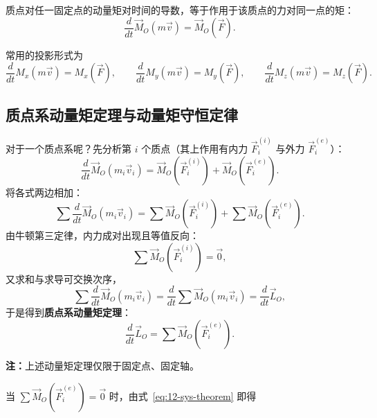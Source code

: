 \begin{theorem}[质点的动量矩定理]
质点对任一固定点的动量矩对时间的导数，等于作用于该质点的力对同一点的矩：
\begin{equation}\label{eq:12-theorem-particle}
  \frac{d}{dt}\vec{M}_O(m\vec{v})=\vec{M}_O\left(\vec{F}\right).
\end{equation}
\end{theorem}

常用的投影形式为
\begin{equation}\label{eq:12-projections}
  \frac{d}{dt}M_x(m\vec{v})=M_x(\vec{F}),\qquad
  \frac{d}{dt}M_y(m\vec{v})=M_y(\vec{F}),\qquad
  \frac{d}{dt}M_z(m\vec{v})=M_z(\vec{F}).
\end{equation}

\subsection{质点系动量矩定理与动量矩守恒定律}

对于一个质点系呢？先分析第 $i$ 个质点（其上作用有内力 $\vec{F}_i^{(i)}$ 与外力 $\vec{F}_i^{(e)}$）：
\begin{equation}\label{eq:12-sys-particle-i}
  \frac{d}{dt}\vec{M}_O(m_i\vec{v}_i)
  =\vec{M}_O\left(\vec{F}_i^{(i)}\right)+\vec{M}_O\left(\vec{F}_i^{(e)}\right).
\end{equation}
将各式两边相加：
\begin{equation}\label{eq:12-sys-sum}
  \sum\frac{d}{dt}\vec{M}_O(m_i\vec{v}_i)
  =\sum\vec{M}_O\left(\vec{F}_i^{(i)}\right)+\sum\vec{M}_O\left(\vec{F}_i^{(e)}\right).
\end{equation}
由牛顿第三定律，内力成对出现且等值反向：
\begin{equation}\label{eq:12-inner-zero}
  \sum\vec{M}_O\left(\vec{F}_i^{(i)}\right)=\vec{0},
\end{equation}
又求和与求导可交换次序，
\begin{equation}\label{eq:12-sum-diff}
  \sum\frac{d}{dt}\vec{M}_O(m_i\vec{v}_i)
  =\frac{d}{dt}\sum\vec{M}_O(m_i\vec{v}_i)
  =\frac{d}{dt}\vec{L}_O,
\end{equation}
于是得到\textbf{质点系动量矩定理}：
\begin{equation}\label{eq:12-sys-theorem}
  \frac{d}{dt}\vec{L}_O=\sum\vec{M}_O\left(\vec{F}_i^{(e)}\right).
\end{equation}

\noindent\textbf{注：}上述动量矩定理仅限于固定点、固定轴。

当 $\sum\vec{M}_O\left(\vec{F}_i^{(e)}\right)=\vec{0}$ 时，由式~\eqref{eq:12-sys-theorem} 即得

